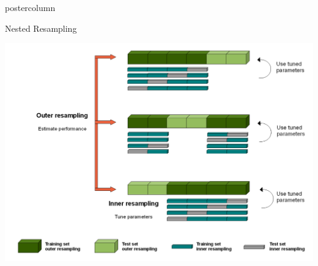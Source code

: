\documentclass{beamer}
\begin{document}
\begin{frame}[fragile]{}
\begin{columns}
\begin{column}{.31\textwidth}
\begin{beamercolorbox}[center]{postercolumn}
\begin{minipage}{.98\textwidth}
{\begin{myblock}{Nested Resampling}
 \begin{center}
             \includegraphics[width=0.9\columnwidth]{img/tuning_2.PNG}
               \end{center}

\end{myblock}

			  }
			\end{minipage}
		\end{beamercolorbox}
	\end{column}
\end{columns}

\end{frame}
\end{document}
